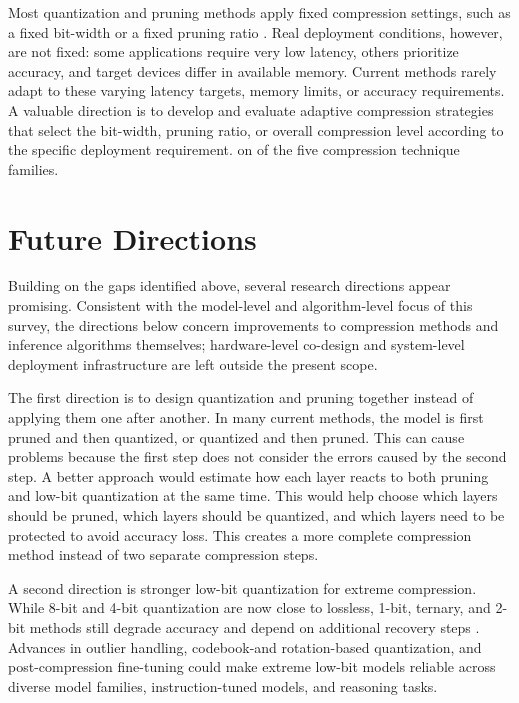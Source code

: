 Most quantization and pruning methods apply fixed compression settings, such as a fixed bit-width or a fixed pruning ratio \cite{cho2025sub4bit}. Real deployment conditions, however, are not fixed: some applications require very low latency, others prioritize accuracy, and target devices differ in available memory. Current methods rarely adapt to these varying latency targets, memory limits, or accuracy requirements. A valuable direction is to develop and evaluate adaptive compression strategies that select the bit-width, pruning ratio, or overall compression level according to the specific deployment requirement. on of the five compression technique families.

\section{Future Directions}
\label{sec:lr-future}

Building on the gaps identified above, several research directions appear promising. Consistent with the model-level and algorithm-level focus of this survey, the directions below concern improvements to compression methods and inference algorithms themselves; hardware-level co-design and system-level deployment infrastructure are left outside the present scope.

The first direction is to design quantization and pruning together instead of applying them one after another. In many current methods, the model is first pruned and then quantized, or quantized and then pruned. This can cause problems because the first step does not consider the errors caused by the second step. A better approach would estimate how each layer reacts to both pruning and low-bit quantization at the same time. This would help choose which layers should be pruned, which layers should be quantized, and which layers need to be protected to avoid accuracy loss. This creates a more complete compression method instead of two separate compression steps.

A second direction is stronger low-bit quantization for extreme compression. While 8-bit and 4-bit quantization are now close to lossless, 1-bit, ternary, and 2-bit methods still degrade accuracy and depend on additional recovery steps \cite{survey2025ptbitnet,huang2024billm,shang2023pbllm}. Advances in outlier handling, codebook-and rotation-based quantization, and post-compression fine-tuning \cite{chen2025efficientqat,malinovskii2024pvtuning} could make extreme low-bit models reliable across diverse model families, instruction-tuned models, and reasoning tasks.

